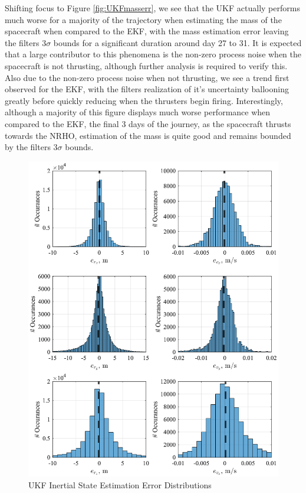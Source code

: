 \documentclass[letterpaper, paper,11pt]{AAS}		%
\begin{document}
Shifting focus to Figure \ref{fig:UKFmasserr}, we see that the UKF actually performs much worse for a majority of the trajectory when estimating the mass of the spacecraft when compared to the EKF, with the mass estimation error leaving the filters $3\sigma$ bounds for a significant duration around day 27 to 31. It is expected that a large contributor to this phenomena is the non-zero process noise when the spacecraft is not thrusting, although further analysis is required to verify this. Also due to the non-zero process noise when not thrusting, we see a trend first observed for the EKF, with the filters realization of it's uncertainty ballooning greatly before quickly reducing when the thrusters begin firing. Interestingly, although a majority of this figure displays much worse performance when compared to the EKF, the final 3 days of the journey, as the spacecraft thrusts towards the NRHO, estimation of the mass is quite good and remains bounded by the filters $3\sigma$ bounds.

\begin{figure}[hbt!]
	\centering 
	\includegraphics{./../../figures/UKFPosVelHist.eps}
	\caption{UKF Inertial State Estimation Error Distributions}
	\label{fig:UKFposvelhist}
\end{figure}
\end{document}
